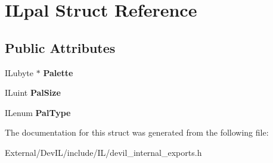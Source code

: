 \hypertarget{structILpal}{
\section{ILpal Struct Reference}
\label{structILpal}
}
\subsection*{Public Attributes}
\begin{DoxyCompactItemize}
\item 
\hypertarget{structILpal_abc8ce06b53b2ca4de6bf2ebda303d746}{
ILubyte $\ast$ {\bfseries Palette}}
\label{structILpal_abc8ce06b53b2ca4de6bf2ebda303d746}

\item 
\hypertarget{structILpal_a0e64a8c7d3cdd2e63b60c947f118db9b}{
ILuint {\bfseries PalSize}}
\label{structILpal_a0e64a8c7d3cdd2e63b60c947f118db9b}

\item 
\hypertarget{structILpal_a586f4c7d59e6f202e1d63c67f7679c23}{
ILenum {\bfseries PalType}}
\label{structILpal_a586f4c7d59e6f202e1d63c67f7679c23}

\end{DoxyCompactItemize}


The documentation for this struct was generated from the following file:\begin{DoxyCompactItemize}
\item 
External/DevIL/include/IL/devil\_\-internal\_\-exports.h\end{DoxyCompactItemize}
